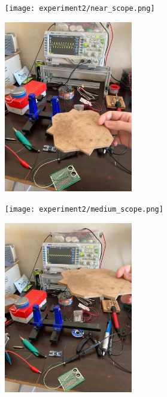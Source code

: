 \documentclass[12pt, a4paper]{article}
\begin{document}
        \begin{figure}[H]\centering
            \texttt{[image: experiment2/near\_scope.png]}
            \caption[]{}\label{fig:ner_scope}
        \end{figure}


        \begin{figure}[H]\centering
            \includegraphics[width=0.5\textwidth]{experiment2/medium.jpg}
            \caption[]{}\label{fig:medium}
        \end{figure}

        \begin{figure}[H]\centering
            \texttt{[image: experiment2/medium\_scope.png]}
            \caption[]{}\label{fig:medium_scope}
        \end{figure}


        \begin{figure}[H]\centering
            \includegraphics[width=0.5\textwidth]{experiment2/far.jpg}
            \caption[]{}\label{fig:far}
        \end{figure}
\end{document}
